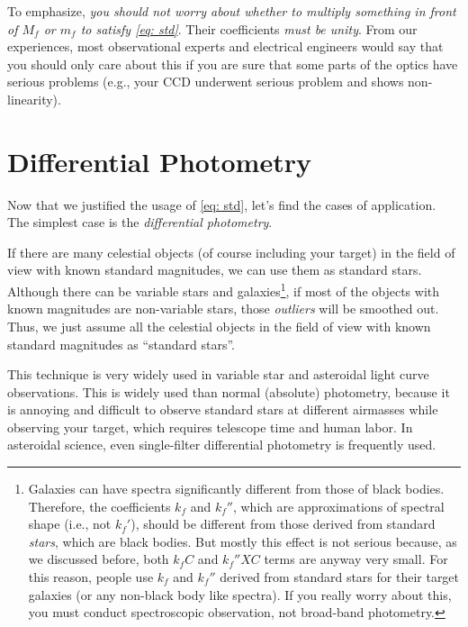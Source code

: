 To emphasize, \emph{you should not worry about whether to \emph{multiply} something in front of $ M_f $ or $ m_f $ to satisfy \cref{eq: std}}. Their coefficients \emph{must be unity}. From our experiences, most observational experts and electrical engineers would say that you should only care about this if you are sure that some parts of the optics have serious problems (e.g., your CCD underwent serious problem and shows non-linearity). 

\section{Differential Photometry}
Now that we justified the usage of \cref{eq: std}, let's find the cases of application. The simplest case is the \textit{differential photometry}. 

If there are many celestial objects (of course including your target) in the field of view with known standard magnitudes, we can use them as standard stars. Although there can be variable stars and galaxies\footnote{Galaxies can have spectra significantly different from those of black bodies. Therefore, the coefficients $ k_f $ and $ k_f'' $, which are approximations of spectral shape (i.e., not $ k_f' $), should be different from those derived from standard \textit{stars}, which are black bodies. But mostly this effect is not serious because, as we discussed before, both $ k_f C $ and $ k_f'' X C $ terms are anyway very small. For this reason, people use $ k_f $ and $ k_f'' $ derived from standard stars for their target galaxies (or any non-black body like spectra). If you really worry about this, you must conduct spectroscopic observation, not broad-band photometry.}, if most of the objects with known magnitudes are non-variable stars, those \textit{outliers} will be smoothed out. Thus, we just assume all the celestial objects in the field of view with known standard magnitudes as ``standard stars''. 

This technique is very widely used in variable star and asteroidal light curve observations. This is widely used than normal (absolute) photometry, because it is annoying and difficult to observe standard stars at different airmasses while observing your target, which requires telescope time and human labor. In asteroidal science, even single-filter differential photometry is frequently used. 


